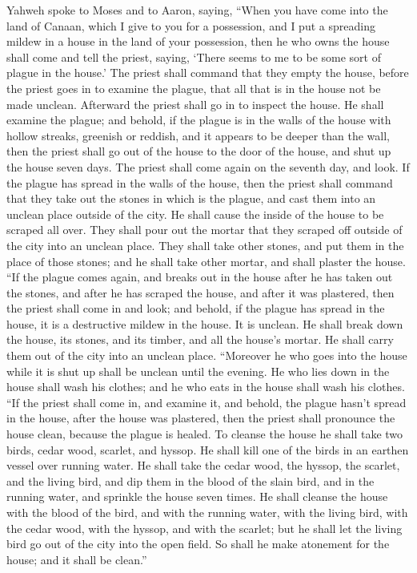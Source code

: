  Yahweh spoke to Moses and to Aaron, saying,
 ``When you have come into the land of Canaan, which I
give to you for a possession, and I put a spreading mildew in a house in
the land of your possession,  then he who owns the house
shall come and tell the priest, saying, `There seems to me to be some
sort of plague in the house.'  The priest shall command
that they empty the house, before the priest goes in to examine the
plague, that all that is in the house not be made unclean. Afterward the
priest shall go in to inspect the house.  He shall
examine the plague; and behold, if the plague is in the walls of the
house with hollow streaks, greenish or reddish, and it appears to be
deeper than the wall,  then the priest shall go out of
the house to the door of the house, and shut up the house seven days.
 The priest shall come again on the seventh day, and
look. If the plague has spread in the walls of the house,
 then the priest shall command that they take out the
stones in which is the plague, and cast them into an unclean place
outside of the city.  He shall cause the inside of the
house to be scraped all over. They shall pour out the mortar that they
scraped off outside of the city into an unclean place. 
They shall take other stones, and put them in the place of those stones;
and he shall take other mortar, and shall plaster the house.
 ``If the plague comes again, and breaks out in the house
after he has taken out the stones, and after he has scraped the house,
and after it was plastered,  then the priest shall come
in and look; and behold, if the plague has spread in the house, it is a
destructive mildew in the house. It is unclean.  He shall
break down the house, its stones, and its timber, and all the house's
mortar. He shall carry them out of the city into an unclean place.
 ``Moreover he who goes into the house while it is shut
up shall be unclean until the evening.  He who lies down
in the house shall wash his clothes; and he who eats in the house shall
wash his clothes.  ``If the priest shall come in, and
examine it, and behold, the plague hasn't spread in the house, after the
house was plastered, then the priest shall pronounce the house clean,
because the plague is healed.  To cleanse the house he
shall take two birds, cedar wood, scarlet, and hyssop. 
He shall kill one of the birds in an earthen vessel over running water.
 He shall take the cedar wood, the hyssop, the scarlet,
and the living bird, and dip them in the blood of the slain bird, and in
the running water, and sprinkle the house seven times. 
He shall cleanse the house with the blood of the bird, and with the
running water, with the living bird, with the cedar wood, with the
hyssop, and with the scarlet;  but he shall let the
living bird go out of the city into the open field. So shall he make
atonement for the house; and it shall be clean.''

